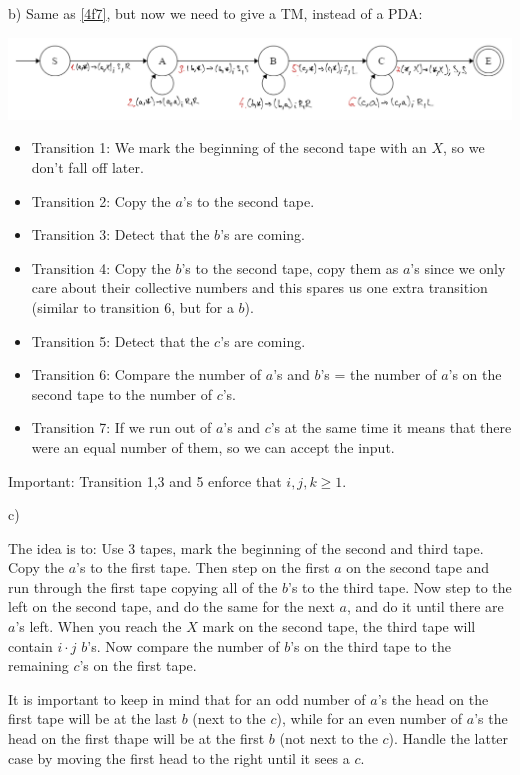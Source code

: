 b) Same as \ref{4f7}, but now we need to give a TM, instead of a PDA:

\includegraphics[width=\linewidth]{05/6_7_b_canvas.png}

\begin{itemize}
    \item Transition 1: We mark the beginning of the second tape with an $X$, so we don't fall off later.
    \item Transition 2: Copy the $a$'s to the second tape.
    \item Transition 3: Detect that the $b$'s are coming.
    \item Transition 4: Copy the $b$'s to the second tape, copy them as $a$'s since we only care about their collective numbers and this spares us one extra transition (similar to transition 6, but for a $b$).
    \item Transition 5: Detect that the $c$'s are coming.
    \item Transition 6: Compare the number of $a$'s and $b$'s = the number of $a$'s on the second tape to the number of $c$'s.
    \item Transition 7: If we run out of $a$'s and $c$'s at the same time it means that there were an equal number of them, so we can accept the input.
\end{itemize}

Important: Transition 1,3 and 5 enforce that $i,j,k \geq{} 1$.

c) 

The idea is to: Use 3 tapes, mark the beginning of the second and third tape. Copy the $a$'s to the first tape. Then step on the first $a$ on the second tape and run through the first tape copying all of the $b$'s to the third tape. Now step to the left on the second tape, and do the same for the next $a$, and do it until there are $a$'s left. When you reach the $X$ mark on the second tape, the third tape will contain $i \cdot j$ $b$'s. Now compare the number of $b$'s on the third tape to the remaining $c$'s on the first tape.

It is important to keep in mind that for an odd number of $a$'s the head on the first tape will be at the last $b$ (next to the $c$), while for an even number of $a$'s the head on the first thape will be at the first $b$ (not next to the $c$). Handle the latter case by moving the first head to the right until it sees a $c$.